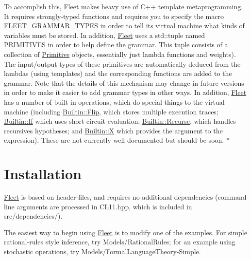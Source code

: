 To accomplish this, \hyperlink{class_fleet}{Fleet} makes heavy use of C++ template metaprogramming. It requires strongly-\/typed functions and requires you to specify the macro F\+L\+E\+E\+T\+\_\+\+G\+R\+A\+M\+M\+A\+R\+\_\+\+T\+Y\+P\+ES in order to tell its virtual machine what kinds of variables must be stored. In addition, \hyperlink{class_fleet}{Fleet} uses a std\+::tuple named P\+R\+I\+M\+I\+T\+I\+V\+ES in order to help define the grammar. This tuple consists of a collection of \hyperlink{struct_primitive}{Primitive} objects, essentially just lambda functions and weights). The input/output types of these primitives are automatically deduced from the lambdas (using templates) and the corresponding functions are added to the grammar. Note that the details of this mechanism may change in future versions in order to make it easier to add grammar types in other ways. In addition, \hyperlink{class_fleet}{Fleet} has a number of built-\/in operations, which do special things to the virtual machine (including \hyperlink{struct_builtin_1_1_flip}{Builtin\+::\+Flip}, which stores multiple execution traces; \hyperlink{struct_builtin_1_1_if}{Builtin\+::\+If} which uses short-\/circuit evaluation; \hyperlink{struct_builtin_1_1_recurse}{Builtin\+::\+Recurse}, which handles recursives hypotheses; and \hyperlink{struct_builtin_1_1_x}{Builtin\+::X} which provides the argument to the expression). These are not currently well documented but should be soon. $\ast$\hypertarget{index_install_sec}{}\section{Installation}\label{index_install_sec}
\hyperlink{class_fleet}{Fleet} is based on header-\/files, and requires no additional dependencies (command line arguments are processed in C\+L11.\+hpp, which is included in src/dependencies/).

The easiest way to begin using \hyperlink{class_fleet}{Fleet} is to modify one of the examples. For simple rational-\/rules style inference, try Models/\+Rational\+Rules; for an example using stochastic operations, try Models/\+Formal\+Language\+Theory-\/\+Simple.

